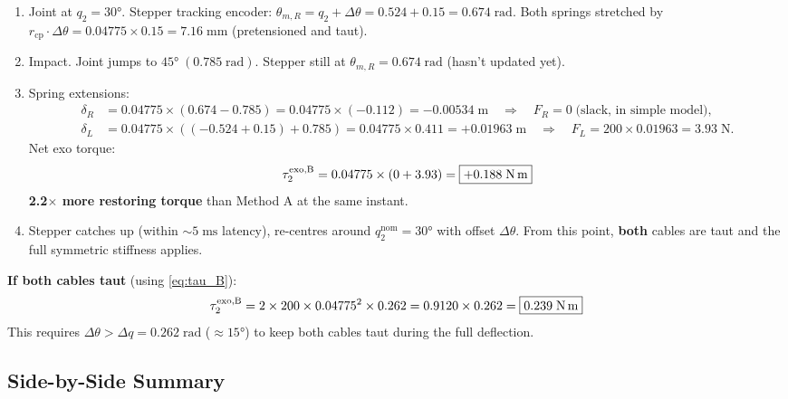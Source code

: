 \documentclass[11pt, a4paper]{article}
\begin{document}
\begin{enumerate}
    \item[\textbf{T$_0$}:] Joint at $q_2 = 30°$.  Stepper tracking
        encoder: $\theta_{m,R} = q_2 + \Delta\theta = 0.524 + 0.15 = 0.674\;\text{rad}$.
        Both springs stretched by $r_{\text{cp}} \cdot \Delta\theta =
        0.04775 \times 0.15 = 7.16\;\text{mm}$ (pretensioned and taut).

    \item[\textbf{T$_1$}:] Impact.  Joint jumps to $45°\;(0.785\;\text{rad})$.
        Stepper still at $\theta_{m,R} = 0.674\;\text{rad}$ (hasn't updated yet).

    \item[\textbf{T$_2$}:] Spring extensions:
        \begin{align*}
            \delta_R &= 0.04775 \times (0.674 - 0.785) = 0.04775 \times (-0.112)
                = -0.00534\;\text{m}
                \quad\Rightarrow\quad F_R = 0 \;\text{(slack, in simple model)}, \\
            \delta_L &= 0.04775 \times ((-0.524+0.15) + 0.785) = 0.04775 \times 0.411
                = +0.01963\;\text{m}
                \quad\Rightarrow\quad F_L = 200 \times 0.01963 = 3.93\;\text{N}.
        \end{align*}
        Net exo torque:
        \[
            \tau_2^{\text{exo,B}} = 0.04775 \times (0 + 3.93)
            = \boxed{+0.188\;\text{N\,m}}
        \]
        \textbf{2.2$\times$ more restoring torque} than Method A at the same instant.

    \item[\textbf{T$_3$}:] Stepper catches up (within $\sim\!5\;\text{ms}$
        latency), re-centres around $q_2^{\text{nom}} = 30°$ with offset
        $\Delta\theta$.  From this point, \textbf{both} cables are taut and
        the full symmetric stiffness applies.
\end{enumerate}

\bigskip
\noindent
\textbf{If both cables taut} (using \eqref{eq:tau_B}):
\[
    \tau_2^{\text{exo,B}} = 2 \times 200 \times 0.04775^2 \times 0.262
    = 0.9120 \times 0.262 = \boxed{0.239\;\text{N\,m}}
\]
This requires $\Delta\theta > \Delta q = 0.262\;\text{rad}$
($\approx 15°$) to keep both cables taut during the full deflection.

\subsection{Side-by-Side Summary}
\end{document}
